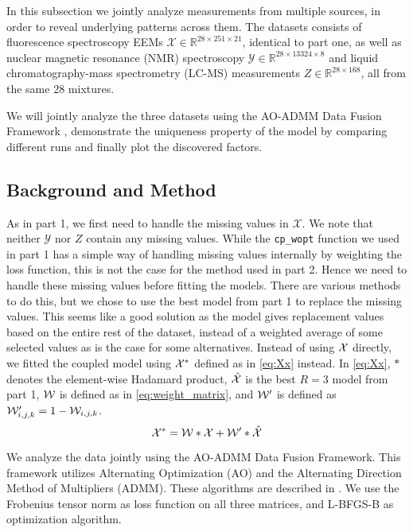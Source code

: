 In this subsection we jointly analyze measurements from multiple sources, in order to reveal underlying patterns across them.
The datasets consists of fluorescence spectroscopy EEMs $\mathcal{X} \in \mathbb{R}^{28 \times 251 \times 21}$, identical to part one, as well as nuclear magnetic resonance (NMR) spectroscopy $\mathcal{Y}\in \mathbb{R}^{28 \times 13324 \times 8}$ and liquid chromatography-mass spectrometry (LC-MS) measurements $Z \in \mathbb{R}^{28 \times 168}$, all from the same 28 mixtures.

We will jointly analyze the three datasets using the AO-ADMM Data Fusion Framework 
\cite{framework}, demonstrate the uniqueness property of the model by comparing different runs and finally plot the discovered factors.


\subsection*{Background and Method}
As in part 1, we first need to handle the missing values in $\mathcal{X}$.
We note that neither $\mathcal{Y}$ nor $Z$ contain any missing values.
While the \texttt{cp\_wopt} function we used in part 1 has a simple way of handling missing values internally by weighting the loss function, this is not the case for the method used in part 2.
Hence we need to handle these missing values before fitting the models.
There are various methods to do this, but we chose to use the best model from part 1 to replace the missing values.
This seems like a good solution as the model gives replacement values based on the entire rest of the dataset, instead of a weighted average of some selected values as is the case for some alternatives.
Instead of using $\mathcal{X}$ directly, we fitted the coupled model using $\mathcal{X}^*$ defined as in \eqref{eq:Xx} instead.
In \eqref{eq:Xx}, $*$ denotes the element-wise Hadamard product, $\mathcal{\hat{X}}$ is the best $R=3$ model from part 1, $\mathcal{W}$ is defined as in \eqref{eq:weight_matrix}, and $\mathcal{W}'$ is defined as $\mathcal{W}'_{i,j,k} = 1 - \mathcal{W}_{i,j,k}$.
\begin{equation}
    \mathcal{X}^* = \mathcal{W}*\mathcal{X} + \mathcal{W}' *\mathcal{\hat{X}}
    \label{eq:Xx}
\end{equation}

We analyze the data jointly using the AO-ADMM Data Fusion Framework\cite{framework}.
This framework utilizes Alternating Optimization (AO) and the Alternating Direction Method of Multipliers (ADMM).
These algorithms are described in \textcite{framework}.
We use the Frobenius tensor norm as loss function on all three matrices, and L-BFGS-B as optimization algorithm.



